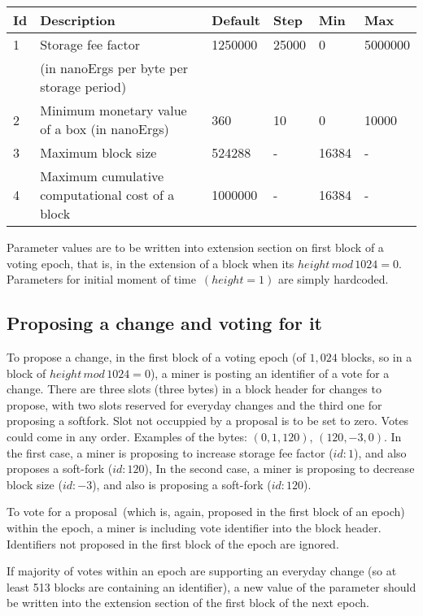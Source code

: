 \begin{tabular}{| l | l | l | l | l | l |}
\hline
Id & Description & Default & Step & Min & Max \\
\hline
\hline
1 & Storage fee factor  & 1250000 & 25000 & 0 & 5000000 \\
  &  (in nanoErgs per byte per storage period) & & & & \\
\hline
2 & Minimum monetary value of a box (in nanoErgs) & 360 & 10 & 0 & 10000 \\
\hline
3 & Maximum block size & 524288 & - & 16384 & - \\
\hline
4 & Maximum cumulative computational cost of a block & 1000000 & - & 16384 & - \\
\hline
\end{tabular}

Parameter values are to be written into extension section on first block of a voting epoch,
that is, in the extension of a block when its $height\,mod\,1024 = 0$.
Parameters for initial moment of time~$(height = 1)$ are simply hardcoded.

\subsection{Proposing a change and voting for it}

To propose a change, in the first block of a voting epoch (of $1,024$ blocks, so in a block of
$height\,mod\,1024 = 0$), a miner is posting an identifier of a vote for a change. There are three slots (three bytes)
in a block header for changes to propose, with two slots reserved for everyday changes and the third one for
proposing a softfork. Slot not occuppied by a proposal is to be set to zero. Votes could come in any order.
Examples of the bytes: $(0, 1, 120)$, $(120, -3, 0)$. In the first case, a miner is proposing to increase storage fee factor ($id:1$), and
also proposes a soft-fork ($id:120$), In the second case, a miner is proposing to decrease block size ($id:-3$), and also
 is proposing a soft-fork ($id:120$).

To vote for a proposal~(which is, again, proposed in the first block of an epoch) within the epoch, a miner is including vote identifier
into the block header. Identifiers not proposed in the first block of the epoch are ignored.

If majority of votes within an epoch are supporting an everyday change (so at least 513 blocks are containing an
identifier), a new value of the parameter should be written into the extension section of the first block of the next
epoch.

